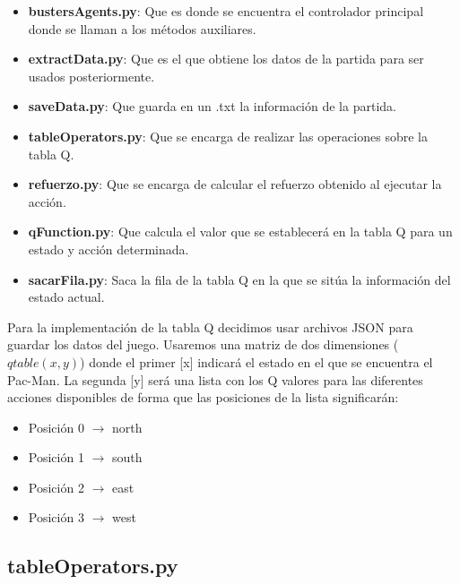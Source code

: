\documentclass[11pt,a4paper]{article}
\begin{document}
\begin{itemize}

\item\textbf{bustersAgents.py}: Que es donde se encuentra el controlador principal donde se llaman a los métodos auxiliares.

\item\textbf{extractData.py}: Que es el que obtiene los datos de la partida para ser usados posteriormente.

\item\textbf{saveData.py}: Que guarda en un .txt la información de la partida.

\item\textbf{tableOperators.py}: Que se encarga de realizar las operaciones sobre la tabla Q.

\item\textbf{refuerzo.py}: Que se encarga de calcular el refuerzo obtenido al ejecutar la acción.

\item\textbf{qFunction.py}: Que calcula el valor que se establecerá en la tabla Q para un estado y acción determinada.

\item\textbf{sacarFila.py}: Saca la fila de la tabla Q en la que se sitúa la información del estado actual.

\end{itemize}

Para la implementación de la tabla Q decidimos usar archivos JSON para guardar los datos del juego. Usaremos una matriz de dos dimensiones ($qtable(x,y)$) donde el primer [x] indicará el estado en el que se encuentra el Pac-Man.
La segunda [y] será una lista con los Q valores para las diferentes acciones disponibles de forma que las posiciones de la lista significarán:

\begin{itemize}
\item Posición 0 $\longrightarrow$ north
\item Posición 1 $\longrightarrow$ south
\item Posición 2 $\longrightarrow$ east
\item Posición 3 $\longrightarrow$ west
\end{itemize}


\subsection{tableOperators.py}
\end{document}
